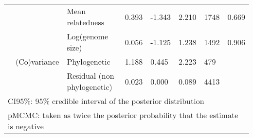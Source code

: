 \begin{table}
\begin{tabular}[t]{llllllll}
\hspace{1em} &  & Mean relatedness & 0.393 & -1.343 & 2.210 & 1748 & 0.669\\
\hspace{1em} &  & Log(genome size) & 0.056 & -1.125 & 1.238 & 1492 & 0.906\\
\hspace{1em} & (Co)variance & Phylogenetic & 1.188 & 0.445 & 2.223 & 479 & \\
\hspace{1em} &  & Residual (non-phylogenetic) & 0.023 & 0.000 & 0.089 & 4413 & \\
\bottomrule
\multicolumn{8}{l}{\rule{0pt}{1em}CI95\%: 95\% credible interval of the posterior distribution}\\
\multicolumn{8}{l}{\rule{0pt}{1em}pMCMC: taken as twice the posterior probability that the estimate is negative}\\
\end{tabular}
\end{table}
